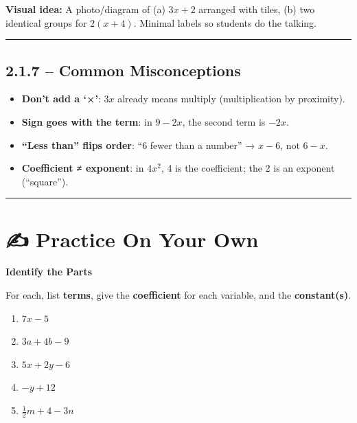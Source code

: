 \documentclass[
  letterpaper,
  DIV=11,
  numbers=noendperiod]{scrreprt}
\providecommand{\tightlist}{%
  \setlength{\itemsep}{0pt}\setlength{\parskip}{0pt}}
\begin{document}
\textbf{Visual idea:} A photo/diagram of (a) \(3x+2\) arranged with
tiles, (b) two identical groups for \(2(x+4)\). Minimal labels so
students do the talking.

\begin{center}\rule{0.5\linewidth}{0.5pt}\end{center}

\subsection*{2.1.7 -- Common
Misconceptions}\label{common-misconceptions}

\begin{itemize}
\tightlist
\item
  \textbf{Don't add a `×'}: \(3x\) already means multiply
  (multiplication by proximity).
\item
  \textbf{Sign goes with the term}: in \(9 - 2x\), the second term is
  \(-2x\).
\item
  \textbf{``Less than'' flips order}: ``6 fewer than a number'' →
  \(x - 6\), not \(6 - x\).
\item
  \textbf{Coefficient ≠ exponent}: in \(4x^2\), 4 is the coefficient;
  the 2 is an exponent (``square'').
\end{itemize}

\begin{center}\rule{0.5\linewidth}{0.5pt}\end{center}

\section*{✍️ Practice On Your Own}\label{practice-on-your-own-7}


\textbf{Identify the Parts}

For each, list \textbf{terms}, give the \textbf{coefficient} for each
variable, and the \textbf{constant(s)}.

\begin{enumerate}
\def\labelenumi{\arabic{enumi}.}
\tightlist
\item
  \(7x - 5\)
\item
  \(3a + 4b - 9\)
\item
  \(5x + 2y - 6\)
\item
  \(-y + 12\)
\item
  \(\tfrac{1}{2}m + 4 - 3n\)
\end{enumerate}
\end{document}
